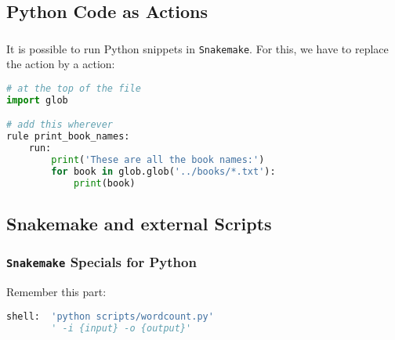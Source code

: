\subsection{Python Code as Actions}

\begin{frame}[fragile]
  \frametitle{}
  \vspace{-0.5em}
  It is possible to run Python snippets in \texttt{Snakemake}. For this, we have to replace the  action by a  action:\vspace{-0.5em}
  \vspace{-0.5em}
  \begin{lstlisting}[language=Python,style=Python, basicstyle=\footnotesize]
# at the top of the file
import glob

# add this wherever
rule print_book_names:
    run:
        print('These are all the book names:')
        for book in glob.glob('../books/*.txt'):
            print(book)

  \end{lstlisting}\vspace{-0.5em}
  \pause\footnotesize
\end{frame}

\subsection{Snakemake and external Scripts}

\begin{frame}[fragile]
  \frametitle{\texttt{Snakemake} Specials for Python}
  Remember this part:
  \begin{lstlisting}[language=Python,style=Python]
shell:  'python scripts/wordcount.py'
        ' -i {input} -o {output}'
  \end{lstlisting}
\end{frame}


